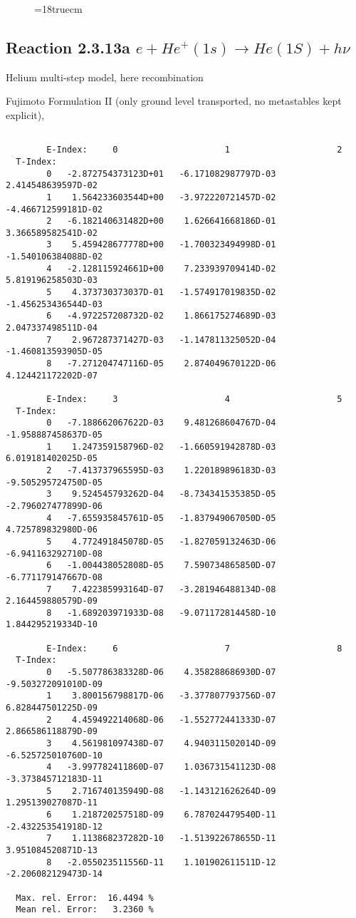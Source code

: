 \begin{figure} \label{2.3.9j}
\epsfxsize=18truecm
\end{figure}
\newpage


\subsection{
Reaction 2.3.13a  $e + He^+(1s) \rightarrow He(1S) + h\nu  $
}

Helium multi-step model, here recombination

 Fujimoto Formulation II (only ground level transported, no metastables kept
explicit), \cite{kn:Fujimoto}


\begin{verbatim}

        E-Index:     0                     1                     2
  T-Index:
        0   -2.872754373123D+01   -6.171082987797D-03    2.414548639597D-02
        1    1.564233603544D+00   -3.972220721457D-02   -4.466712599181D-02
        2   -6.182140631482D+00    1.626641668186D-01    3.366589582541D-02
        3    5.459428677778D+00   -1.700323494998D-01   -1.540106384088D-02
        4   -2.128115924661D+00    7.233939709414D-02    5.819196258503D-03
        5    4.373730373037D-01   -1.574917019835D-02   -1.456253436544D-03
        6   -4.972257208732D-02    1.866175274689D-03    2.047337498511D-04
        7    2.967287371427D-03   -1.147811325052D-04   -1.460813593905D-05
        8   -7.271204747116D-05    2.874049670122D-06    4.124421172202D-07

        E-Index:     3                     4                     5
  T-Index:
        0   -7.188662067622D-03    9.481268604767D-04   -1.958887458637D-05
        1    1.247359158796D-02   -1.660591942878D-03    6.019181402025D-05
        2   -7.413737965595D-03    1.220189896183D-03   -9.505295724750D-05
        3    9.524545793262D-04   -8.734341535385D-05   -2.796027477899D-06
        4   -7.655935845761D-05   -1.837949067050D-05    4.725789832980D-06
        5    4.772491845078D-05   -1.827059132463D-06   -6.941163292710D-08
        6   -1.004438052808D-05    7.590734865850D-07   -6.771179147667D-08
        7    7.422385993164D-07   -3.281946488134D-08    2.164459880579D-09
        8   -1.689203971933D-08   -9.071172814458D-10    1.844295219334D-10

        E-Index:     6                     7                     8
  T-Index:
        0   -5.507786383328D-06    4.358288686930D-07   -9.503272091010D-09
        1    3.800156798817D-06   -3.377807793756D-07    6.828447501225D-09
        2    4.459492214068D-06   -1.552772441333D-07    2.866586118879D-09
        3    4.561981097438D-07    4.940311502014D-09   -6.525725010760D-10
        4   -3.997782411860D-07    1.036731541123D-08   -3.373845712183D-11
        5    2.716740135949D-08   -1.143121626264D-09    1.295139027087D-11
        6    1.218720257518D-09    6.787024479540D-11   -2.432253541918D-12
        7    1.113868237282D-10   -1.513922678655D-11    3.951084520871D-13
        8   -2.055023511556D-11    1.101902611511D-12   -2.206082129473D-14

  Max. rel. Error:  16.4494 %
  Mean rel. Error:   3.2360 %
\end{verbatim}
